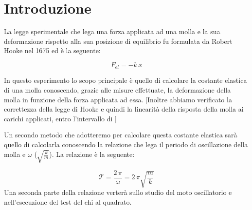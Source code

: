 \section{Introduzione}
La legge sperimentale che lega una forza applicata ad una molla e la sua deformazione rispetto alla sua posizione di equilibrio fu formulata da Robert Hooke nel 1675 ed è la seguente:

\begin{equation}
	F_{el} = -k\,x
	\label{hooke}
\end{equation}

In questo esperimento lo scopo principale è quello di calcolare la costante elastica di una molla conoscendo, grazie alle misure effettuate, la deformazione della molla in funzione della forza applicata ad essa. [Inoltre abbiamo verificato la correttezza della legge di Hooke e quindi la linearità della risposta della molla ai carichi applicati, entro l'intervallo di ]

Un secondo metodo che adotteremo per calcolare questa costante elastica sarà quello di calcolarla conoscendo la relazione che lega il periodo di oscillazione della molla e $\omega$ ($\sqrt{\frac{k}{m}}$). La relazione è la seguente:

\begin{equation}
	\mathcal{T} = \frac{2\,\pi}{\omega} = {2\,\pi}{\sqrt{\frac{m}{k}}}
\end{equation}
Una seconda parte della relazione verterà sullo studio del moto oscillatorio e nell'esecuzione del test del chi al quadrato.
